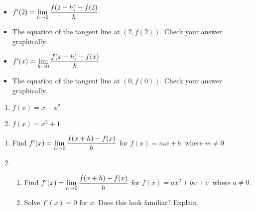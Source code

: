 \begin{itemize}

\item  $f'(2)  = \displaystyle{\lim_{h \rightarrow 0} \dfrac{f(2+h) - f(2)}{h}}$

\item  The equation of the tangent line at $(2, f(2))$.  Check your answer graphically.

\item  $f'(x) = \displaystyle{\lim_{h \rightarrow 0} \dfrac{f(x+h) - f(x)}{h}}$

\item  The equation of the tangent line at $(0,f(0))$.  Check your answer graphically.
 
\end{itemize}



\begin{multicols}{2}
\begin{enumerate}
\setcounter{enumi}{\value{HW}}

\item\label{tangentlinepolyfirst}  $f(x) = x-x^2$ 
\item\label{tangentlinepolylast} $f(x) = x^{3} + 1$

\setcounter{HW}{\value{enumi}}
\end{enumerate}
\end{multicols}




\begin{enumerate}
\setcounter{enumi}{\value{HW}}

\item  Find $f'(x) = \displaystyle{\lim_{h \rightarrow 0} \dfrac{f(x+h) - f(x)}{h}}$  for $f(x) = mx + b\;$ where $m \neq 0$

\item \begin{enumerate}  \item Find $f'(x) = \displaystyle{\lim_{h \rightarrow 0} \dfrac{f(x+h) - f(x)}{h}}$   for  $f(x) = ax^{2} + bx + c\;$ where $a \neq 0$.

\item  Solve $f'(x) = 0$ for $x$.  Does this look familiar?  Explain.

\end{enumerate}

\setcounter{HW}{\value{enumi}}
\end{enumerate}





